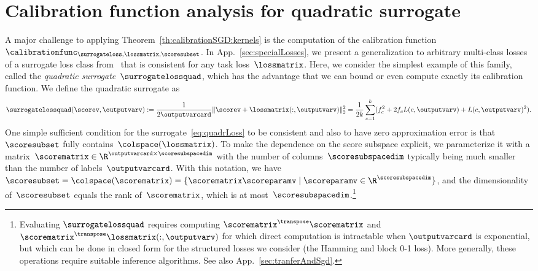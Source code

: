 \documentclass{article}
\begin{document}
\section{Calibration function analysis for quadratic surrogate}
\label{sec:quadrSurr}
A major challenge to applying Theorem~\ref{th:calibrationSGD:kernels} is the computation of the calibration function 
$\calibrationfunc_{\surrogateloss,\lossmatrix,\scoresubset}$.
In App.~\ref{sec:specialLosses}, we present a generalization to arbitrary multi-class losses of a surrogate loss class from~\citet[Section 4.4.2]{zhang04} that is consistent for any task loss~$\lossmatrix$. Here, we consider the simplest example of this family, called the \emph{quadratic surrogate}~$\surrogatelossquad$, which has the advantage that we can bound or even compute exactly its calibration function.
%
We define the quadratic surrogate as
\begin{equation}
\label{eq:quadrLoss}
\surrogatelossquad( \scorev, \outputvarv )
:=
\frac{1}{2\outputvarcard} \| \scorev + \lossmatrix(:, \outputvarv)\|_2^2 = \frac{1}{2k} \sum_{c=1}^k (f_c^2 + 2f_c L(c,\outputvarv)  + L(c,\outputvarv)^2).
%
%
\end{equation}
One simple sufficient condition for the surrogate~\eqref{eq:quadrLoss} to be consistent and also to have zero approximation error is that $\scoresubset$ fully contains~$\colspace(\lossmatrix)$.
To make the dependence on the score subspace explicit, we parameterize it with a matrix~$\scorematrix \in \R^{\outputvarcard \times \scoresubspacedim}$ with the number of columns~$\scoresubspacedim$ typically being much smaller than the number of labels~$\outputvarcard$.
With this notation, we have $\scoresubset = \colspace(\scorematrix) = \{\scorematrix\scoreparamv \mid \scoreparamv\in \R^\scoresubspacedim\}$, and the dimensionality of~$\scoresubset$ equals the rank of~$\scorematrix$, which is at most~$\scoresubspacedim$.\footnote{Evaluating $\surrogatelossquad$ requires computing $\scorematrix^\transpose \scorematrix$ and $\scorematrix^\transpose \lossmatrix(:, \outputvarv)$ for which direct computation is intractable when $\outputvarcard$ is exponential, but which can be done in closed form for the structured losses we consider (the Hamming and block 0-1 loss).
More generally, these operations require suitable inference algorithms. See also App.~\ref{sec:tranferAndSgd}.}
%
\end{document}
